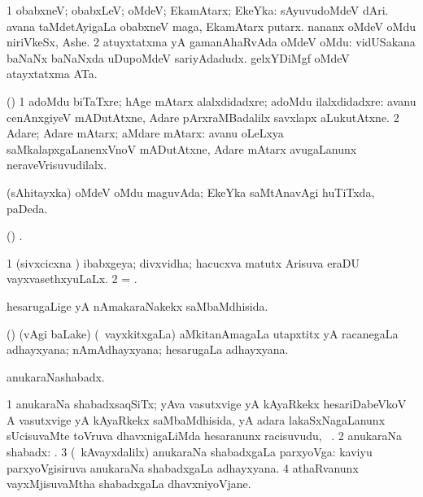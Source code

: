 \bentry
{}
\gl{\gu}
\bmng
\bnum
\num{1} obabxneV; obabxLeV; oMdeV; EkamAtarx; EkeYka:  sAyuvudoMdeV dAri.  avana taMdetAyigaLa obabxneV maga, EkamAtarx putarx.  nananx oMdeV oMdu niriVkeSx, Ashe. 
\num{2} atuyxtatxma yA gamanAhaRvAda oMdeV oMdu:  vidUSakana baNaNx baNaNxda uDupoMdeV sariyAdadudx.  gelxYDiMgf oMdeV atayxtatxma ATa. 
\enum
\emng
\eentry

\bentry
{}
\gl{\saMavayx}
\bmng
(\AmA) 
\bnum
\num{1} adoMdu biTaTxre; hAge mAtarx alalxdidadxre; adoMdu ilalxdidadxre:  avanu cenAnxgiyeV mADutAtxne, Adare pArxraMBadalilx savxlapx aLukutAtxne. 
\num{2} Adare; Adare mAtarx; aMdare mAtarx:  avanu oLeLxya saMkalapxgaLanenxVnoV mADutAtxne, Adare mAtarx avugaLanunx neraveVrisuvudilalx. 
\enum
\emng
\eentry

\bentry
{}
\gl{\gu}
\bmng
(sAhitayxka) oMdeV oMdu maguvAda; EkeYka saMtAnavAgi huTiTxda, paDeda. 
\emng
\eentry

\bentry
{}
\gl{\saMkiSx}
\bmng
(\birx) . 
\emng
\eentry

\bentry
{}
\gl{\gu}
\bmng
\bnum
\num{1} (sivxcicxna \vi) ibabxgeya; divxvidha; hacucxva matutx Arisuva eraDU vayxvasethxyuLaLx. 
\num{2} = . 
\enum
\emng
\eentry

\bentry
{}
\gl{\gu}
\bmng
hesarugaLige yA nAmakaraNakekx saMbaMdhisida. 
\emng
\eentry

\bentry
{}
\gl{\nA}
\bmng
(\bava) (\Eva vAgi baLake) (\kanmu\ vayxkitxgaLa) aMkitanAmagaLa utapxtitx yA racanegaLa adhayxyana; nAmAdhayxyana; hesarugaLa adhayxyana. 
\emng
\eentry

\bentry
{}
\gl{\nA}
\bmng
anukaraNashabadx. 
\emng
\eentry

\bentry
{}
\gl{\nA}
\bmng
% 
\bnum
\num{1} anukaraNa shabadxsaqSiTx; yAva vasutxvige yA kAyaRkekx hesariDabeVkoV A vasutxvige yA kAyaRkekx saMbaMdhisida, yA adara lakaSxNagaLanunx sUcisuvaMte toVruva dhavxnigaLiMda hesaranunx racisuvudu, \udA\ . 
\num{2} anukaraNa shabadx: . 
\num{3} (\kanmu\ kAvayxdalilx) anukaraNa shabadxgaLa parxyoVga:  kaviyu parxyoVgisiruva anukaraNa shabadxgaLa adhayxyana. 
\num{4} athaRvanunx vayxMjisuvaMtha shabadxgaLa dhavxniyoVjane. 
\enum
\emng
\eentry

